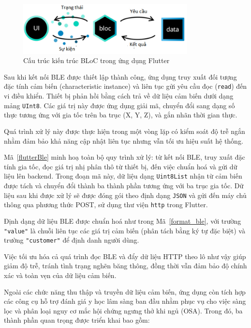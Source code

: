 \begin{figure}[htbp]
    \centering
    \includegraphics[width=0.8\textwidth]{images/flutter.png}
    \caption{Cấu trúc kiến trúc BLoC trong ứng dụng Flutter}
    \label{flutter}
\end{figure}





Sau khi kết nối BLE được thiết lập thành công, ứng dụng truy xuất đối tượng đặc 
tính cảm biến (characteristic instance) và liên tục gửi yêu cầu đọc (\texttt{read}) 
đến vi điều khiển. Thiết bị phản hồi bằng cách trả về dữ liệu cảm biến 
dưới dạng mảng \texttt{UInt8}. Các giá trị này được ứng dụng giải mã, 
chuyển đổi sang dạng số thực tương ứng với gia tốc trên ba trục (X, Y, Z), 
và gắn nhãn thời gian thực.

Quá trình xử lý này được thực hiện trong một vòng 
lặp có kiểm soát độ trễ ngắn nhằm đảm bảo khả năng cập nhật liên tục 
nhưng vẫn tối ưu hiệu suất hệ thống.

Mã~\ref{flutterBle} minh hoạ toàn bộ quy trình xử lý: 
từ kết nối BLE, truy xuất đặc tính gia tốc, đọc giá trị nhị phân 
thô từ thiết bị, đến việc chuẩn hoá và gửi dữ liệu lên backend. 
Trong đoạn mã này, dữ liệu dạng \texttt{Uint8List} nhận từ cảm biến được tách và chuyển đổi 
thành ba thành phần tương ứng với ba trục gia tốc. Dữ liệu sau khi được xử lý sẽ được 
đóng gói theo định dạng \texttt{JSON} và gửi đến máy chủ thông qua phương thức 
POST, sử dụng thư viện \texttt{http} trong Flutter.

Định dạng dữ liệu BLE được chuẩn hoá như trong Mã~\ref{format_ble}, 
với trường \texttt{"value"} là chuỗi liên tục các 
giá trị cảm biến (phân tách bằng ký tự đặc biệt) và trường 
\texttt{"customer"} để định danh người dùng.

Việc tối ưu hóa cả quá trình đọc BLE và đẩy dữ liệu HTTP theo lô 
như vậy giúp giảm độ trễ, tránh tình trạng nghẽn băng thông, đồng thời 
vẫn đảm bảo độ chính xác và toàn vẹn của dữ liệu cảm biến.


Ngoài các chức năng thu thập và truyền dữ liệu cảm biến, ứng dụng còn tích hợp 
các công cụ hỗ trợ đánh giá y học lâm sàng ban đầu nhằm phục vụ cho việc sàng 
lọc và phân loại nguy cơ mắc hội chứng ngưng thở khi ngủ (OSA). Trong đó, 
ba thành phần quan trọng được triển khai bao gồm:

